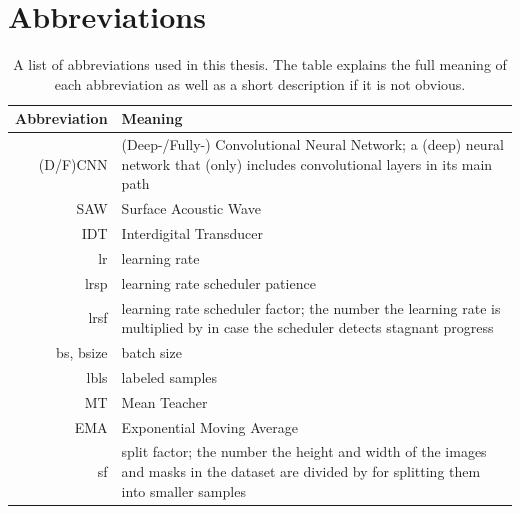 \chapter{Abbreviations}
{
    \renewcommand*{\arraystretch}{1.1}
    \begin{table}[htbp]
        \centering
        \begin{tabular}{rp{}} 
            \toprule
            Abbreviation & Meaning\\
            \midrule 
            (D/F)CNN & (Deep-/Fully-) Convolutional Neural Network; a (deep) neural network that (only) includes convolutional layers in its main path\\
            SAW & Surface Acoustic Wave\\
            IDT & Interdigital Transducer\\
            lr & learning rate\\
            lrsp & learning rate scheduler patience\\
            lrsf & \linespread{1.0}\selectfont learning rate scheduler factor; the number the learning rate is multiplied by in case the scheduler detects stagnant progress\\
            bs, bsize & batch size\\
            lbls & labeled samples \\
            MT & Mean Teacher \\
            EMA & Exponential Moving Average \\
            sf & \linespread{1.0}\selectfont split factor; the number the height and width of the images and masks in the dataset are divided by for splitting them into smaller samples\\
            \bottomrule
        \end{tabular}
        \vspace{0.1cm}
        \caption{A list of abbreviations used in this thesis. The table explains the full meaning of each abbreviation as well as a short description if it is not obvious.}
        \label{tab:abbreviations}
    \end{table}
}

